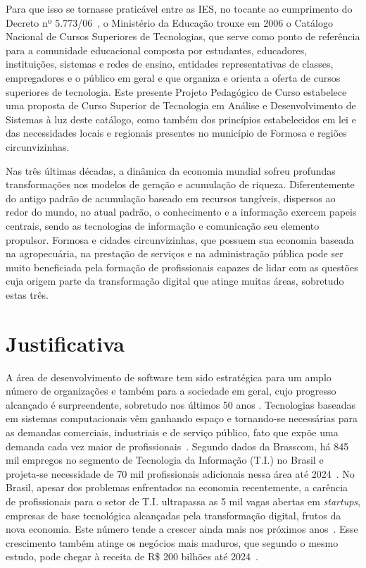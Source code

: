 \documentclass[11pt,fleqn]{book} %
\begin{document}
Para que isso se tornasse praticável entre as IES, no tocante ao cumprimento do Decreto nº 5.773/06~\cite{Decreto5773De2006}, o Ministério da Educação trouxe em 2006 o Catálogo Nacional de Cursos Superiores de Tecnologias, que serve como ponto de referência para a comunidade educacional composta por estudantes, educadores, instituições, sistemas e redes de ensino, entidades representativas de classes, empregadores e o público em geral e que  organiza e orienta a oferta de cursos superiores de tecnologia. Este presente Projeto Pedagógico de Curso estabelece uma proposta de Curso Superior de Tecnologia em Análise e Desenvolvimento de Sistemas à luz deste catálogo, como também dos princípios estabelecidos em lei e das necessidades locais e regionais presentes no município de Formosa e regiões circunvizinhas.

Nas três últimas décadas, a dinâmica da economia mundial sofreu profundas transformações nos modelos de geração e acumulação de riqueza. Diferentemente do antigo padrão de acumulação baseado
em recursos tangíveis, dispersos ao redor do mundo, no atual padrão, o conhecimento e a informação exercem papeis centrais, sendo as tecnologias de informação e comunicação seu elemento propulsor. Formosa e cidades circunvizinhas, que possuem sua economia baseada na agropecuária, na prestação de serviços e na administração pública pode ser muito beneficiada pela formação de profissionais capazes de lidar com as questões cuja origem parte da transformação digital que atinge muitas áreas, sobretudo estas três.

\section{Justificativa}

A área de desenvolvimento de software tem sido estratégica para um amplo número de organizações e também para a sociedade em geral, cujo progresso alcançado é surpreendente, sobretudo nos últimos 50 anos  \cite{sommerville2019engenharia}. 
Tecnologias baseadas em sistemas computacionais vêm ganhando espaço e tornando-se necessárias para as demandas comerciais, industriais e de serviço público, fato que expõe uma demanda cada vez maior de profissionais~\cite{Istoe2019}.
Segundo dados da Brasscom, há 845 mil empregos no segmento de Tecnologia da Informação (T.I.) no Brasil e projeta-se necessidade de 70 mil profissionais adicionais nessa área até 2024~\cite{Convergencia2019}. 
No Brasil, apesar dos problemas enfrentados na economia recentemente, a carência de profissionais para o setor de T.I. ultrapassa as 5 mil vagas abertas em \textit{startups}, empresas de base tecnológica alcançadas pela transformação digital, frutos da nova economia. Este número tende a crescer ainda mais nos próximos anos~\cite{Brasscom2019}. 
Esse crescimento também atinge os negócios mais maduros, que segundo o mesmo estudo, pode chegar à receita de R\$ 200 bilhões até 2024~\cite{Brasscom2019}.
\end{document}
